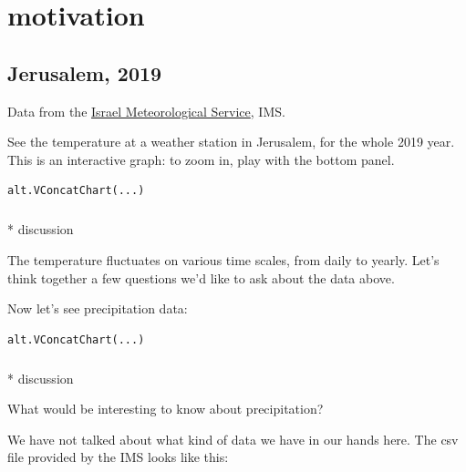 \documentclass[
  letterpaper,
  DIV=11,
  numbers=noendperiod]{scrreprt}
\makeatletter
\let\oldparagraph\paragraph
\renewcommand{\paragraph}{
    \@ifstar
      \xxxParagraphStar
      \xxxParagraphNoStar
  }
\newcommand{\xxxParagraphStar}[1]{\oldparagraph*{#1}\mbox{}}
\newcommand{\xxxParagraphNoStar}[1]{\oldparagraph{#1}\mbox{}}
\makeatother
\begin{document}
\chapter{motivation}\label{motivation}

\section{Jerusalem, 2019}\label{jerusalem-2019}

Data from the \href{https://ims.gov.il/en/data_gov}{Israel
Meteorological Service}, IMS.

See the temperature at a weather station in Jerusalem, for the whole
2019 year. This is an interactive graph: to zoom in, play with the
bottom panel.

\begin{verbatim}
alt.VConcatChart(...)
\end{verbatim}

\paragraph*{\texorpdfstring{ discussion}{ discussion}}\label{discussion}

The temperature fluctuates on various time scales, from daily to yearly.
Let's think together a few questions we'd like to ask about the data
above.

Now let's see precipitation data:

\begin{verbatim}
alt.VConcatChart(...)
\end{verbatim}

\paragraph*{\texorpdfstring{
discussion}{ discussion}}\label{discussion-1}

What would be interesting to know about precipitation?

We have not talked about what kind of data we have in our hands here.
The csv file provided by the IMS looks like this:
\end{document}
